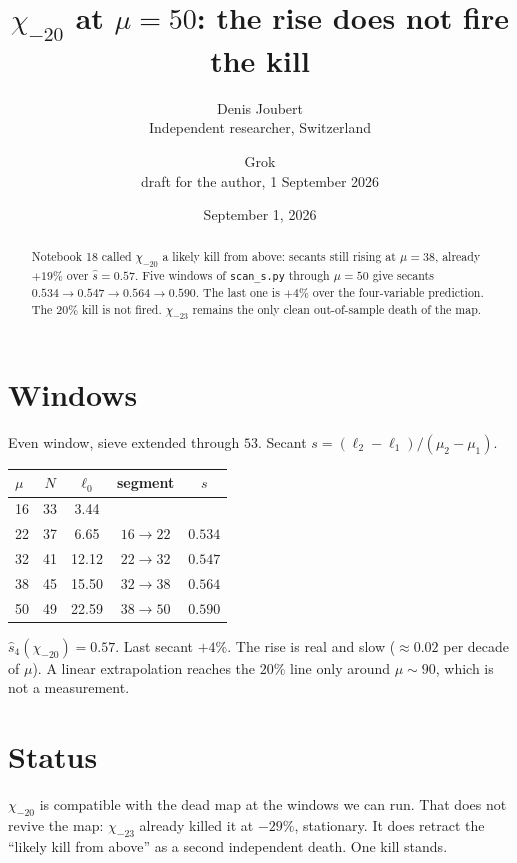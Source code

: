\documentclass[10pt]{article}
\title{\bfseries $\chi_{-20}$ at $\mu=50$: the rise does not fire the kill}
\author{Denis Joubert\\ \small Independent researcher, Switzerland
\and Grok\\ \small draft for the author, 1 September 2026}
\date{September 1, 2026}
\begin{document}
\maketitle
\begin{abstract}
\noindent
Notebook 18 called $\chi_{-20}$ a likely kill from above: secants
still rising at $\mu=38$, already $+19\%$ over $\hat s=0.57$.
Five windows of \texttt{scan\_s.py} through $\mu=50$ give secants
$0.534\to0.547\to0.564\to0.590$. The last one is $+4\%$ over the
four-variable prediction. The $20\%$ kill is not fired. $\chi_{-23}$
remains the only clean out-of-sample death of the map.
\end{abstract}

\section{Windows}
Even window, sieve extended through $53$. Secant $s=(\ell_2-\ell_1)/(\mu_2-\mu_1)$.
\begin{center}\small
\begin{tabular}{lcccc}
\toprule
$\mu$ & $N$ & $\ell_0$ & segment & $s$ \\
\midrule
16 & 33 & 3.44 & & \\
22 & 37 & 6.65 & $16\to22$ & $0.534$ \\
32 & 41 & 12.12 & $22\to32$ & $0.547$ \\
38 & 45 & 15.50 & $32\to38$ & $0.564$ \\
50 & 49 & 22.59 & $38\to50$ & $0.590$ \\
\bottomrule
\end{tabular}
\end{center}
$\hat s_4(\chi_{-20})=0.57$. Last secant $+4\%$. The rise is real
and slow ($\approx0.02$ per decade of $\mu$). A linear extrapolation
reaches the $20\%$ line only around $\mu\sim90$, which is not a
measurement.

\section{Status}
$\chi_{-20}$ is compatible with the dead map at the windows we can
run. That does not revive the map: $\chi_{-23}$ already killed it
at $-29\%$, stationary. It does retract the ``likely kill from
above'' as a second independent death. One kill stands.
\end{document}
